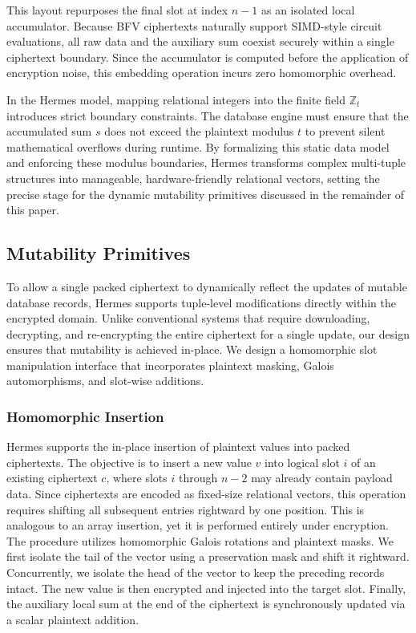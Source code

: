 \documentclass[sigconf,nonacm]{acmart}
\begin{document}
This layout repurposes the final slot at index $n-1$ as an isolated local accumulator. Because BFV ciphertexts naturally support SIMD-style circuit evaluations, all raw data and the auxiliary sum coexist securely within a single ciphertext boundary. Since the accumulator is computed before the application of encryption noise, this embedding operation incurs zero homomorphic overhead. 

In the Hermes model, mapping relational integers into the finite field $\mathbb{Z}_t$ introduces strict boundary constraints. The database engine must ensure that the accumulated sum $s$ does not exceed the plaintext modulus $t$ to prevent silent mathematical overflows during runtime. By formalizing this static data model and enforcing these modulus boundaries, Hermes transforms complex multi-tuple structures into manageable, hardware-friendly relational vectors, setting the precise stage for the dynamic mutability primitives discussed in the remainder of this paper.

\subsection{Mutability Primitives}
\label{sec:primitives}

To allow a single packed ciphertext to dynamically reflect the updates of mutable database records, Hermes supports tuple-level modifications directly within the encrypted domain. Unlike conventional systems that require downloading, decrypting, and re-encrypting the entire ciphertext for a single update, our design ensures that mutability is achieved in-place. We design a homomorphic slot manipulation interface that incorporates plaintext masking, Galois automorphisms, and slot-wise additions.

\subsubsection{Homomorphic Insertion}

Hermes supports the in-place insertion of plaintext values into packed ciphertexts. The objective is to insert a new value $v$ into logical slot $i$ of an existing ciphertext $c$, where slots $i$ through $n-2$ may already contain payload data. Since ciphertexts are encoded as fixed-size relational vectors, this operation requires shifting all subsequent entries rightward by one position. This is analogous to an array insertion, yet it is performed entirely under encryption.
The procedure utilizes homomorphic Galois rotations and plaintext masks. We first isolate the tail of the vector using a preservation mask and shift it rightward. Concurrently, we isolate the head of the vector to keep the preceding records intact. The new value is then encrypted and injected into the target slot. Finally, the auxiliary local sum at the end of the ciphertext is synchronously updated via a scalar plaintext addition.
\end{document}
